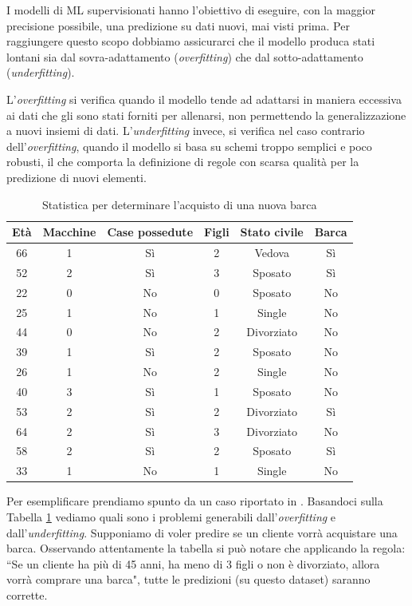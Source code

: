 \documentclass[12pt,italian]{report}
\begin{document}
I modelli di ML supervisionati hanno l'obiettivo di eseguire, con la maggior precisione possibile, una predizione su dati nuovi, mai visti prima. Per raggiungere questo scopo dobbiamo assicurarci che il modello produca stati lontani sia dal sovra-adattamento (\emph{overfitting}) che dal sotto-adattamento (\emph{underfitting}). 

L'\emph{overfitting} si verifica quando il modello tende ad adattarsi in maniera eccessiva ai dati che gli sono stati forniti per allenarsi, non permettendo la generalizzazione a nuovi insiemi di dati. 
L'\emph{underfitting} invece, si verifica nel caso contrario dell'\emph{overfitting}, quando il modello si basa su schemi troppo semplici e poco robusti, il che comporta la definizione di regole con scarsa qualità per la predizione di nuovi elementi.

\begin{table}[h!]
	\center
	\caption{Statistica per determinare l'acquisto di una nuova barca}
	\label{table_customers}
	\vspace{3 mm}
	\begin{tabular}{|c|c|c|c|c|c|}
		\hline
		Età & Macchine &  Case possedute & Figli & Stato civile & Barca    \\
		\hline
		66 & 1 & Sì & 2 & Vedova & Sì \\
		52 & 2 & Sì & 3 & Sposato & Sì \\
		22 & 0 & No & 0 & Sposato & No \\
		25 & 1 & No & 1 & Single & No \\
		44 & 0 & No & 2 & Divorziato & No \\
		39 & 1 & Sì & 2 & Sposato & No \\
		26 & 1 & No & 2 & Single & No \\
		40 & 3 & Sì & 1 & Sposato & No \\
		53 & 2 & Sì & 2 & Divorziato & Sì \\
		64 & 2 & Sì & 3 & Divorziato & No \\
		58 & 2 & Sì & 2 & Sposato & Sì \\
		33 & 1 & No & 1 & Single & No \\
		\hline
	\end{tabular}
\end{table}

Per esemplificare prendiamo spunto da un caso riportato in \cite{intro_machine_learning}. Basandoci sulla Tabella \ref{table_customers} vediamo quali sono i problemi generabili dall'\emph{overfitting} e dall'\emph{underfitting}. Supponiamo di voler predire se un cliente vorrà acquistare una barca. Osservando attentamente la tabella si può notare che applicando la regola: ``Se un cliente ha più di 45 anni, ha meno di 3 figli o non è divorziato, allora vorrà comprare una barca", tutte le predizioni (su questo dataset) saranno corrette.
\end{document}
